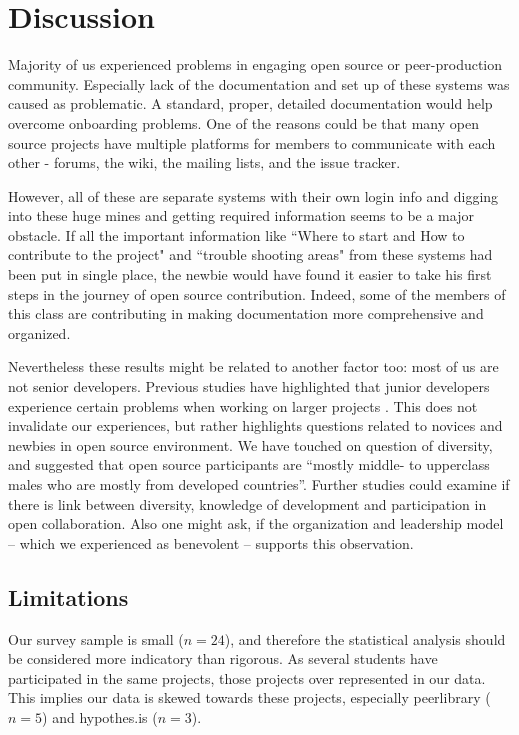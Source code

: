 \section{Discussion}

Majority of us experienced problems in engaging open source or peer-production community. Especially lack of the documentation and set up of these systems was caused as problematic. A standard, proper, detailed documentation  would help overcome onboarding problems. One of the reasons could be  that many open source projects have multiple platforms for members to communicate with each other - forums, the wiki, the mailing lists, and the issue tracker.

However, all of these are separate systems with their own login info and digging into these huge mines and getting required information seems to be a major obstacle. If all the important information like ``Where to start and How to contribute to the project" and ``trouble shooting areas" from these systems had been put in single place, the newbie would have found it easier to take his first steps in the journey of open source contribution. Indeed, some of the members of this class are contributing in making documentation more comprehensive and organized.

Nevertheless these results might be related to another factor too: most of us are not senior developers. Previous studies have highlighted that junior developers experience certain problems when working on larger projects \cite{Begel2008}. This does not invalidate our experiences, but rather highlights questions related to novices and newbies in open source environment. We have touched on question of diversity, and suggested that open source participants are ``mostly middle- to upperclass males who are mostly from developed countries''. Further studies could examine if there is link between diversity, knowledge of development and participation in open collaboration. Also one might ask, if the organization and leadership model -- which we experienced as benevolent -- supports this observation.


\subsection{Limitations}
\label{sec:limitations}
Our survey sample is small ($n=24$), and therefore the statistical analysis should be considered more indicatory than rigorous. As several students have participated in the same projects, those projects over represented in our data. This implies our data is skewed towards these projects, especially peerlibrary ($n=5$) and hypothes.is ($n=3$).

